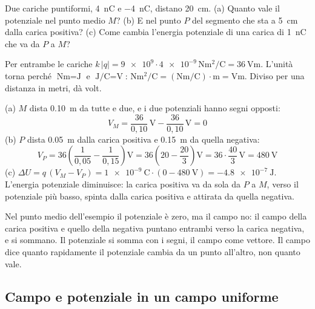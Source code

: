 \begin{esempio}
Due cariche puntiformi, \SI{+4}{\nano\coulomb} e \SI{-4}{\nano\coulomb}, distano \SI{20}{\centi\metre}. (a) Quanto vale il potenziale nel punto medio $M$? (b) E nel punto $P$ del segmento che sta a \SI{5}{\centi\metre} dalla carica positiva? (c) Come cambia l'energia potenziale di una carica di \SI{+1}{\nano\coulomb} che va da $P$ a $M$?

Per entrambe le cariche $k\,|q| = \num{9e9} \cdot \num{4e-9}\,\si{\newton\metre\squared\per\coulomb} = \SI{36}{\volt\metre}$. L'unità torna perché $\si{\newton\metre} = \si{\joule}$ e $\si{\joule\per\coulomb} = \si{\volt}$: $\si{\newton\metre\squared\per\coulomb} = (\si{\newton\metre}/\si{\coulomb}) \cdot \si{\metre} = \si{\volt\metre}$. Diviso per una distanza in metri, dà volt.

(a) $M$ dista \SI{0,10}{\metre} da tutte e due, e i due potenziali hanno segni opposti:
\[
  V_M = \frac{36}{0{,}10}\,\si{\volt} - \frac{36}{0{,}10}\,\si{\volt} = 0
\]
(b) $P$ dista \SI{0,05}{\metre} dalla carica positiva e \SI{0,15}{\metre} da quella negativa:
\[
  V_P = 36 \left( \frac{1}{0{,}05} - \frac{1}{0{,}15} \right) \si{\volt} = 36 \left( 20 - \frac{20}{3} \right) \si{\volt} = 36 \cdot \frac{40}{3}\,\si{\volt} = \SI{480}{\volt}
\]
(c) $\Delta U = q\,(V_M - V_P) = \SI{1e-9}{\coulomb} \cdot (0 - \SI{480}{\volt}) = \SI{-4,8e-7}{\joule}$. L'energia potenziale diminuisce: la carica positiva va da sola da $P$ a $M$, verso il potenziale più basso, spinta dalla carica positiva e attirata da quella negativa.
\end{esempio}

\begin{attenzione}
Nel punto medio dell'esempio il potenziale è zero, ma il campo no: il campo della carica positiva e quello della negativa puntano entrambi verso la carica negativa, e si sommano. Il potenziale si somma con i segni, il campo come vettore. Il campo dice quanto rapidamente il potenziale cambia da un punto all'altro, non quanto vale.
\end{attenzione}

\subsection{Campo e potenziale in un campo uniforme}

